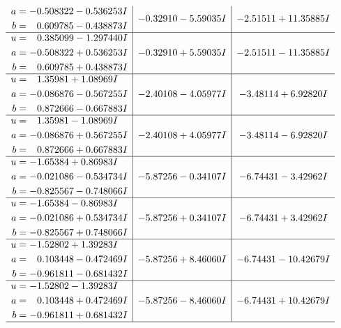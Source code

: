 \documentclass[1p]{elsarticle_modified}
\theoremstyle{definition}
\begin{document}
$$\begin{array}{c|c|c}
\begin{aligned}
a &= -0.508322 - 0.536253 I \\
b &= \phantom{-}0.609785 - 0.438873 I\end{aligned}
 & -0.32910 - 5.59035 I & -2.51511 + 11.35885 I \\ \hline\begin{aligned}
u &= \phantom{-}0.385099 - 1.297440 I \\
a &= -0.508322 + 0.536253 I \\
b &= \phantom{-}0.609785 + 0.438873 I\end{aligned}
 & -0.32910 + 5.59035 I & -2.51511 - 11.35885 I \\ \hline\begin{aligned}
u &= \phantom{-}1.35981 + 1.08969 I \\
a &= -0.086876 - 0.567255 I \\
b &= \phantom{-}0.872666 - 0.667883 I\end{aligned}
 & -2.40108 - 4.05977 I & -3.48114 + 6.92820 I \\ \hline\begin{aligned}
u &= \phantom{-}1.35981 - 1.08969 I \\
a &= -0.086876 + 0.567255 I \\
b &= \phantom{-}0.872666 + 0.667883 I\end{aligned}
 & -2.40108 + 4.05977 I & -3.48114 - 6.92820 I \\ \hline\begin{aligned}
u &= -1.65384 + 0.86983 I \\
a &= -0.021086 - 0.534734 I \\
b &= -0.825567 - 0.748066 I\end{aligned}
 & -5.87256 - 0.34107 I & -6.74431 - 3.42962 I \\ \hline\begin{aligned}
u &= -1.65384 - 0.86983 I \\
a &= -0.021086 + 0.534734 I \\
b &= -0.825567 + 0.748066 I\end{aligned}
 & -5.87256 + 0.34107 I & -6.74431 + 3.42962 I \\ \hline\begin{aligned}
u &= -1.52802 + 1.39283 I \\
a &= \phantom{-}0.103448 - 0.472469 I \\
b &= -0.961811 - 0.681432 I\end{aligned}
 & -5.87256 + 8.46060 I & -6.74431 - 10.42679 I \\ \hline\begin{aligned}
u &= -1.52802 - 1.39283 I \\
a &= \phantom{-}0.103448 + 0.472469 I \\
b &= -0.961811 + 0.681432 I\end{aligned}
 & -5.87256 - 8.46060 I & -6.74431 + 10.42679 I\\
 \hline 
 \end{array}$$\newpage\newpage\renewcommand{\arraystretch}{1}
\end{document}
